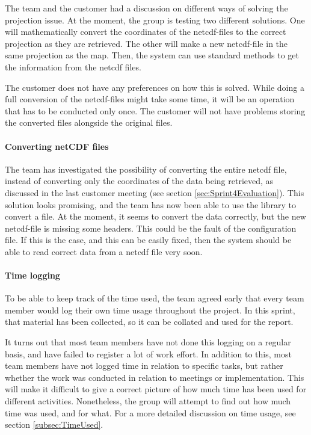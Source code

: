 \documentclass[11pt,a4paper,titlepage,oneside]{report}
\begin{document}
The team and the customer had a discussion on different ways of solving the projection issue. At the moment, the group is testing two different solutions. One will mathematically convert the coordinates of the \gls{netcdf}-files to the correct projection as they are retrieved. The other will make a new \gls{netcdf}-file in the same projection as the map. Then, the system can use standard methods to get the information from the \gls{netcdf} files. 

The customer does not have any preferences on how this is solved. While doing a full conversion of the \gls{netcdf}-files might take some time, it will be an operation that has to be conducted only once. The customer will not have problems storing the converted files alongside the original files. 

\paragraph{Converting netCDF files}
The team has investigated the possibility of converting the entire \gls{netcdf} file, instead of converting only the coordinates of the data being retrieved, as discussed in the last customer meeting (see section \ref{sec:Sprint4Evaluation}). This solution looks promising, and the team has now been able to use the library to convert a file. At the moment, it seems to convert the data correctly, but the new \gls{netcdf}-file is missing some headers. This could be the fault of the configuration file. If this is the case, and this can be easily fixed, then the system should be able to read correct data from a \gls{netcdf} file very soon.

\paragraph{Time logging}
To be able to keep track of the time used, the team agreed early that every team member would log their own time usage throughout the project. In this sprint, that material has been collected, so it can be collated and used for the report. 

It turns out that most team members have not done this logging on a regular basis, and have failed to register a lot of work effort. In addition to this, most team members have not logged time in relation to specific tasks, but rather whether the work was conducted in relation to meetings or implementation. This will make it difficult to give a correct picture of how much time has been used for different activities. Nonetheless, the group will attempt to find out how much time was used, and for what. For a more detailed discussion on time usage, see section \ref{subsec:TimeUsed}.
\end{document}
